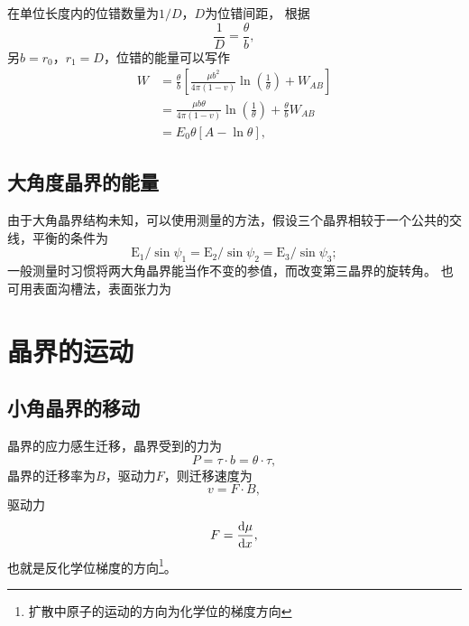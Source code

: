             在单位长度内的位错数量为$1/D$，$D$为位错间距，
            根据
            \begin{equation}
                \frac{1}{D}=\frac{\theta}{b},
            \end{equation}
            另$b=r_0$，$r_1=D$，位错的能量可以写作
            \begin{equation}
                \begin{split}
                    W&=\frac{\theta}{b}\left[\frac{\mu b^{2}}{4 \pi(1-v)} \ln \left(\frac{1}{\theta}\right)+W_{A B}\right]\\
                    &=\frac{\mu b \theta}{4 \pi(1-v)} \ln \left(\frac{1}{\theta}\right)+\frac{\theta}{b} W_{A B}\\
                    &=E_{0} \theta[A-\ln \theta],
                \end{split}
            \end{equation}
            
        \subsection{大角度晶界的能量}
            由于大角晶界结构未知，可以使用测量的方法，假设三个晶界相较于一个公共的交线，平衡的条件为
            \begin{equation}
                \mathrm{E}_{1} / \sin \psi_{1}= \mathrm{E}_{2} / \sin \psi_{2}=\mathrm{E}_{3} / \sin \psi_{3};
            \end{equation}
            一般测量时习惯将两大角晶界能当作不变的参值，而改变第三晶界的旋转角。
            也可用表面沟槽法，表面张力为
    \section{晶界的运动}
        \subsection{小角晶界的移动}
            晶界的应力感生迁移，晶界受到的力为
            \begin{equation}
                P=\tau\cdot b=\theta\cdot\tau,
            \end{equation}
            晶界的迁移率为$B$，驱动力$F$，则迁移速度为
            \begin{equation}
                v=F\cdot B,
            \end{equation}
            驱动力
            \begin{equation}
                F=\frac{\mathop{}\!\mathrm{d} \mu}{\mathop{}\!\mathrm{d} x},
            \end{equation}
            也就是反化学位梯度的方向\footnote{扩散中原子的运动的方向为化学位的梯度方向}。
            
